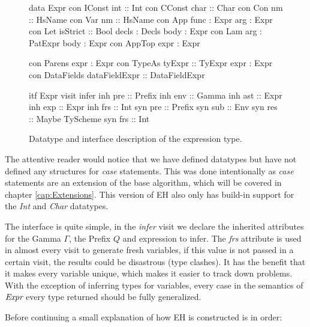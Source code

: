 \begin{figure}[H]
\begin{minipage}[t]{0.5\linewidth}
\begin{code}
data Expr
  con IConst
    int           :: Int
  con CConst
    char          :: Char
  con Con
    nm            :: HsName
  con Var
    nm            :: HsName
  con App
    func          :  Expr
    arg           :  Expr
  con Let
    isStrict      :: Bool
    decls         :  Decls
    body          :  Expr
  con Lam
    arg           :  PatExpr
    body          :  Expr
  con AppTop
    expr          :  Expr
\end{code}
\end{minipage}
\begin{minipage}[t]{0.5\linewidth}
\begin{code}
  con Parens
    expr          :  Expr
  con TypeAs
    tyExpr        :: TyExpr
    expr          :  Expr
  con DataFields
    dataFieldExpr :: DataFieldExpr

itf Expr
  visit infer
    inh pre :: Prefix
    inh env :: Gamma
    inh ast :: Expr
    inh exp :: Expr
    inh frs :: Int
    syn pre :: Prefix
    syn sub :: Env
    syn res :: Maybe TyScheme
    syn frs :: Int
\end{code}
\end{minipage}
\caption{Datatype and interface description of the expression type.}
\label{abs:fig:tyexpr}
\end{figure}

The attentive reader would notice that we have defined datatypes but have not defined any structures for \emph{case} statements. This was done intentionally as \emph{case} statements are an extension of the base algorithm, which will be covered in chapter \ref{cap:Extensions}. This version of EH also only has build-in support for the \emph{Int} and \emph{Char} datatypes.

The interface is quite simple, in the \emph{infer} visit we declare the inherited attributes for the Gamma $\Gamma$, the Prefix $Q$ and expression to infer. The \emph{frs} attribute is used in almost every visit to generate fresh variables, if this value is not passed in a certain visit, the results could be disastrous (type clashes). It has the benefit that it makes every variable unique, which makes it easier to track down problems. With the exception of inferring types for variables, every case in the semantics of $\emph{Expr}$ every type returned should be fully generalized.

Before continuing a small explanation of how EH is constructed is in order:

